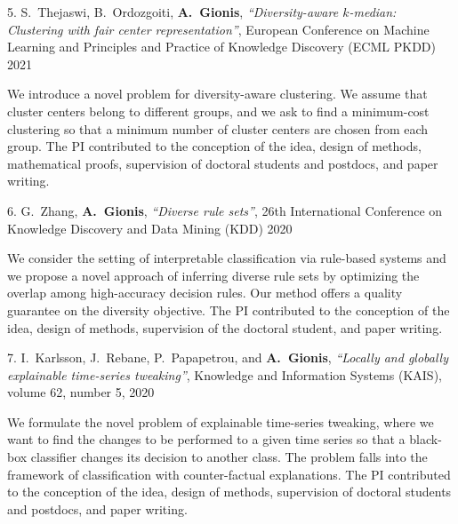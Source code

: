 \documentclass[a4paper,11pt]{article}
\begin{document}
\textbibspace

\item[{5.}]
{S.\ Thejaswi, B.\ Ordozgoiti, \textbf{A.\ Gionis}},
{\em ``Diversity-aware $k$-median: Clustering with fair center representation''},
European Conference on Machine Learning and Principles and Practice of Knowledge Discovery (ECML PKDD) 2021 
%
\item[]
We introduce a novel problem for diversity-aware clustering. 
We assume that cluster centers belong to different groups, 
and we ask to find a minimum-cost clustering so that 
a minimum number of cluster centers are chosen from each group. 
The PI contributed to the conception of the idea, 
design of methods, mathematical proofs, supervision of doctoral students and postdocs, and paper writing.


\textbibspace

\item[{6.}]
{G.\ Zhang, \textbf{A.\ Gionis}},
{\em ``Diverse rule sets''},
26th International Conference on Knowledge Discovery and Data Mining (KDD) 2020
%
\item[]
We consider the setting of interpretable classification via rule-based systems and
we propose a novel approach of inferring diverse rule sets by optimizing the overlap among 
high-accuracy decision rules.
Our method offers a quality guarantee on the diversity objective. 
The PI contributed to the conception of the idea, 
design of methods, supervision of the doctoral student, and paper writing.


\textbibspace

\item[{7.}]
{I.\ Karlsson, J.\ Rebane, P.\ Papapetrou, and \textbf{A.\ Gionis}}, 
{\em ``Locally and globally explainable time-series tweaking''}, 
Knowledge and Information Systems (KAIS),
volume 62, number 5, 2020
%
\item[]
We formulate the novel problem of explainable time-series tweaking, 
where we want to find the changes to be performed to a given time series 
so that a black-box classifier changes its decision to another class. 
The problem falls into the framework of classification with counter-factual explanations. 
The PI contributed to the conception of the idea, 
design of methods, supervision of doctoral students and postdocs, and paper writing.
\end{document}
